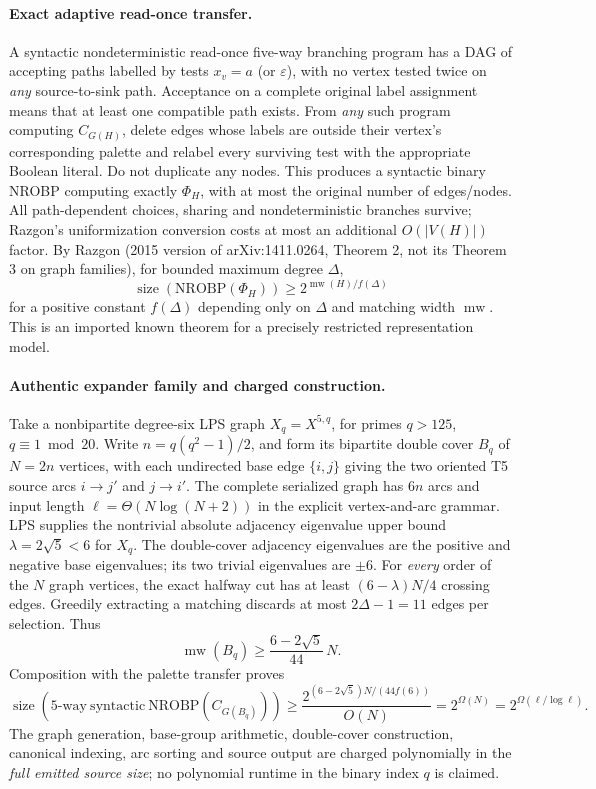 \documentclass[11pt]{article}
\begin{document}
\paragraph{Exact adaptive read-once transfer.}
A syntactic nondeterministic read-once five-way
branching program has a DAG of accepting paths
labelled by tests $x_v=a$ (or $\varepsilon$), with
no vertex tested twice on \emph{any} source-to-sink path.
Acceptance on a complete original label assignment
means that at least one compatible path exists.
From \emph{any} such program computing
$C_{G(H)}$, delete edges whose labels are outside
their vertex's corresponding palette and relabel
every surviving test with the appropriate Boolean
literal. Do not duplicate any nodes. This produces
a syntactic binary NROBP computing exactly $\Phi_H$,
with at most the original number of edges/nodes.
All path-dependent choices, sharing and nondeterministic
branches survive; Razgon's uniformization conversion
costs at most an additional $O(|V(H)|)$ factor.
By Razgon (2015 version of arXiv:1411.0264,
Theorem 2, not its Theorem 3 on graph families),
for bounded maximum degree $\Delta$,
\[
\operatorname{size}(\mathrm{NROBP}(\Phi_H))
 \ge 2^{\operatorname{mw}(H)/f(\Delta)}
\]
for a positive constant $f(\Delta)$ depending
only on $\Delta$ and matching width $\operatorname{mw}$.
This is an imported known theorem for a precisely
restricted representation model.

\paragraph{Authentic expander family and charged construction.}
Take a nonbipartite degree-six LPS graph
$X_q=X^{5,q}$, for primes $q>125$, $q\equiv1\bmod20$.
Write $n=q(q^2-1)/2$, and form its bipartite double
cover $B_q$ of $N=2n$ vertices, with each undirected
base edge $\{i,j\}$ giving the two oriented T5
source arcs $i\to j'$ and $j\to i'$.
The complete serialized graph has $6n$ arcs and
input length $\ell=\Theta(N\log(N+2))$ in the
explicit vertex-and-arc grammar.
LPS supplies the nontrivial absolute adjacency
eigenvalue upper bound $\lambda=2\sqrt5<6$
for $X_q$. The double-cover adjacency eigenvalues
are the positive and negative base eigenvalues;
its two trivial eigenvalues are $\pm6$.
For \emph{every} order of the $N$ graph vertices,
the exact halfway cut has at least
$(6-\lambda)N/4$ crossing edges. Greedily
extracting a matching discards at most $2\Delta-1=11$
edges per selection. Thus
\[
 \operatorname{mw}(B_q)
 \ge\frac{6-2\sqrt5}{44}\,N.
\]
Composition with the palette transfer proves
\[
\operatorname{size}(\mathrm{5\mbox{-}way\
 syntactic\ NROBP}(C_{G(B_q)}))
 \ge \frac{2^{(6-2\sqrt5)N/(44 f(6))}}{O(N)}
 =2^{\Omega(N)}
 =2^{\Omega(\ell/\log\ell)}.
\]
The graph generation, base-group arithmetic,
double-cover construction, canonical indexing,
arc sorting and source output are charged
polynomially in the \emph{full emitted source size};
no polynomial runtime in the binary index $q$
is claimed.
\end{document}
